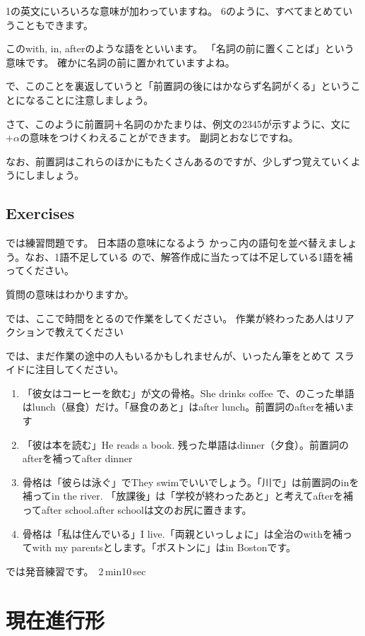 \documentclass[book,jafontscale=0.9247]{jlreq}
\newcommand{\mySagyo}{%
\par%
\bigskip
では、ここで時間をとるので作業をしてください。
作業が終わったあ人はリアクションで教えてください\par%
\begin{minipage}[t]{.98\textwidth}
\mbox{}\hrulefill\mbox{}\par%
\mbox{}\hfill{}\raisebox{-.5\height}{作業}\hfill\mbox{}\par%
\mbox{}\hrulefill\mbox{}
\end{minipage}%
\par%
\bigskip%
では、まだ作業の途中の人もいるかもしれませんが、いったん筆をとめて
スライドに注目してください。%
\par%
\bigskip
}
\begin{document}
1の英文にいろいろな意味が加わっていますね。
6のように、すべてまとめていうこともできます。

このwith, in, afterのような語をといいます。
「名詞の前に置くことば」という意味です。
確かに名詞の前に置かれていますよね。

で、このことを裏返していうと「前置詞の後にはかならず名詞がくる」ということになることに注意しましょう。

さて、このように\hbox{前置詞＋名詞}のかたまりは、例文の2345が示すように、文に
$+\alpha$の意味をつけくわえることができます。
副詞とおなじですね。

なお、前置詞はこれらのほかにもたくさんあるのですが、少しずつ覚えていくようにしましょう。

\section{Exercises}

では練習問題です。
日本語の意味になるよう かっこ内の語句を並べ替えましょう。なお、1語不足している
ので、解答作成に当たっては不足している1語を補ってください。

質問の意味はわかりますか。

\mySagyo

\begin{enumerate}
 \item 「彼女はコーヒーを飲む」が文の骨格。She drinks coffee で、のこった単語はlunch（昼食）だけ。「昼食のあと」はafter lunch。前置詞のafterを補います
 \item 「彼は本を読む」He reads a book. 残った単語はdinner（夕食）。前置詞のafterを補ってafter dinner
 \item 骨格は「彼らは泳ぐ」でThey swimでいいでしょう。「川で」は前置詞のinを補ってin the river. 「放課後」は「学校が終わったあと」と考えてafterを補ってafter school.after schoolは文のお尻に置きます。
 \item 骨格は「私は住んでいる」I live.「両親といっしょに」は全治のwithを補ってwith my parentsとします。「ボストンに」はin Bostonです。
\end{enumerate}

では発音練習です。
\faVolumeUp\,2\,min10\,sec
\chapter{現在進行形}
\end{document}

